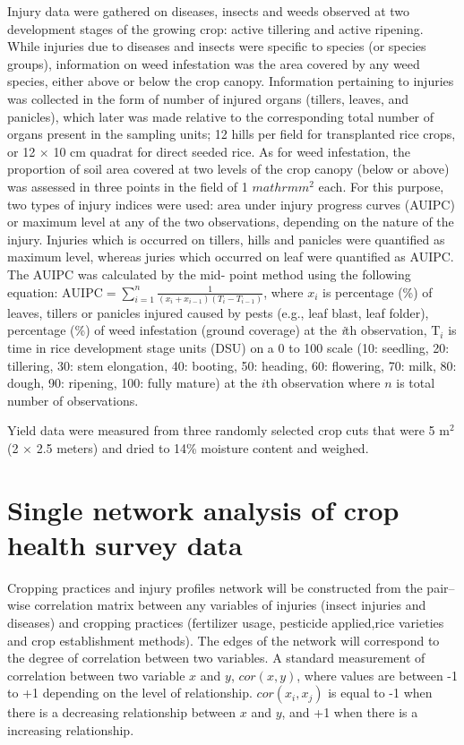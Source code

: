 Injury data were gathered on diseases, insects and weeds observed at two development stages of the growing crop: active tillering and active ripening. While injuries due to diseases and insects were specific to species (or species groups), information on weed infestation was the area covered by any weed species, either above or below the crop canopy. Information pertaining to injuries was collected in the form of number of injured organs (tillers, leaves, and panicles), which later was made relative to the corresponding total number of organs present in the sampling units; 12 hills per field for transplanted rice crops, or 12 $\times$ 10 cm quadrat for direct seeded rice. As for weed infestation, the proportion of soil area covered at two levels of the crop canopy (below or above) was assessed in three points in the field of 1 $mathrm{m}^{2}$ each. For this purpose, two types of injury indices were used: area under injury progress curves (AUIPC) or maximum level at any of the two observations, depending on the nature of the injury. Injuries which is occurred on tillers, hills and panicles were quantified as maximum level, whereas juries which occurred on leaf were quantified as AUIPC. The AUIPC was calculated by the mid- point method using the following equation: $\mathrm{AUIPC} = \sum\limits_{i=1}^n\frac{1}{(x_{i} + x_{i-1})(T_{i} - T_{i-1})}$, where $x_i$ is percentage (\%) of leaves, tillers or panicles injured caused by pests (e.g., leaf blast, leaf folder), percentage (\%) of weed infestation (ground coverage) at the \textit{i}th observation, $\mathrm{T}_{i}$ is time in rice development stage units (DSU) on a 0 to 100 scale (10: seedling, 20: tillering, 30: stem elongation, 40: booting, 50: heading, 60: flowering, 70: milk, 80: dough, 90: ripening, 100: fully mature) at the $i$th observation where $n$ is total number of observations.

Yield data were measured from three randomly selected crop cuts that were 5 $\mathrm{m}^{2}$ (2 $\times$ 2.5 meters) and dried to 14\% moisture content and weighed.

\section*{Single network analysis of crop health survey data}

Cropping practices and injury profiles network will be constructed from the pair--wise correlation matrix between any variables of injuries (insect injuries and diseases) and cropping practices (fertilizer usage, pesticide applied,rice varieties and crop establishment methods). The edges of the network will correspond to the degree of correlation between two variables. A standard measurement of correlation between two variable $x$ and $y$, $cor(x,y)$, where values are  between -1 to +1 depending on the level of relationship. $cor(x_{i}, x_{j})$ is equal to -1 when there is a decreasing relationship between $x$ and $y$, and +1 when there is a increasing relationship.

